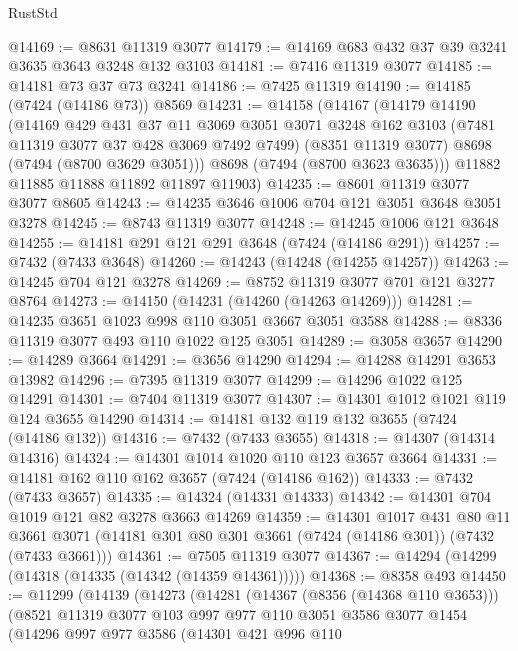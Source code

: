 \begin{lexlean}{RustStd}
\begin{coremodule}
{\begin{coremodule}
{{{{{{{{{{{{{{{{{{{{{{{{{{{{{{{{@14169 := @8631 @11319 @3077
@14179 := @14169 @683 @432 @37 @39 @3241 @3635 @3643 @3248 @132 @3103
@14181 := @7416 @11319 @3077
@14185 := @14181 @73 @37 @73 @3241
@14186 := @7425 @11319
@14190 := @14185 (@7424 (@14186 @73)) @8569
@14231 := @14158
    (@14167
      (@14179
        @14190
        (@14169
          @429
          @431
          @37
          @11
          @3069
          @3051
          @3071
          @3248
          @162
          @3103
          (@7481 @11319 @3077 @37 @428 @3069 @7492 @7499)
          (@8351 @11319 @3077)
          @8698
          (@7494 (@8700 @3629 @3051)))
        @8698
        (@7494 (@8700 @3623 @3635)))
      @11882
      @11885
      @11888
      @11892
      @11897
      @11903)
@14235 := @8601 @11319 @3077 @3077 @8605
@14243 := @14235 @3646 @1006 @704 @121 @3051 @3648 @3051 @3278
@14245 := @8743 @11319 @3077
@14248 := @14245 @1006 @121 @3648
@14255 := @14181 @291 @121 @291 @3648 (@7424 (@14186 @291))
@14257 := @7432 (@7433 @3648)
@14260 := @14243 (@14248 (@14255 @14257))
@14263 := @14245 @704 @121 @3278
@14269 := @8752 @11319 @3077 @701 @121 @3277 @8764
@14273 := @14150 (@14231 (@14260 (@14263 @14269)))
@14281 := @14235 @3651 @1023 @998 @110 @3051 @3667 @3051 @3588
@14288 := @8336 @11319 @3077 @493 @110 @1022 @125 @3051
@14289 := @3058 @3657
@14290 := @14289 @3664
@14291 := @3656 @14290
@14294 := @14288 @14291 @3653 @13982
@14296 := @7395 @11319 @3077
@14299 := @14296 @1022 @125 @14291
@14301 := @7404 @11319 @3077
@14307 := @14301 @1012 @1021 @119 @124 @3655 @14290
@14314 := @14181 @132 @119 @132 @3655 (@7424 (@14186 @132))
@14316 := @7432 (@7433 @3655)
@14318 := @14307 (@14314 @14316)
@14324 := @14301 @1014 @1020 @110 @123 @3657 @3664
@14331 := @14181 @162 @110 @162 @3657 (@7424 (@14186 @162))
@14333 := @7432 (@7433 @3657)
@14335 := @14324 (@14331 @14333)
@14342 := @14301 @704 @1019 @121 @82 @3278 @3663 @14269
@14359 := @14301
    @1017
    @431
    @80
    @11
    @3661
    @3071
    (@14181 @301 @80 @301 @3661 (@7424 (@14186 @301)) (@7432 (@7433 @3661)))
@14361 := @7505 @11319 @3077
@14367 := @14294 (@14299 (@14318 (@14335 (@14342 (@14359 @14361)))))
@14368 := @8358 @493
@14450 := @11299
    (@14139
      (@14273
        (@14281
          (@14367 (@8356 (@14368 @110 @3653)))
          (@8521
            @11319
            @3077
            @103
            @997
            @977
            @110
            @3051
            @3586
            @3077
            @1454
            (@14296
              @997
              @977
              @3586
              (@14301
                @421
                @996
                @110
}}}}}}}}}}}}}}}}}}}}}}}}}}}}}}}}
\end{coremodule}}
\end{coremodule}
\end{lexlean}
